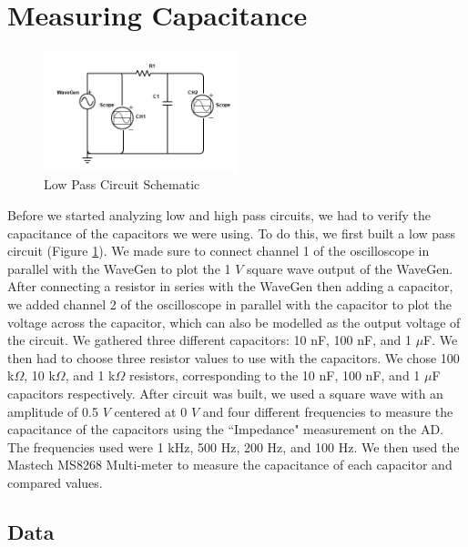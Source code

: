 \documentclass{article}
\begin{document}
\section{Measuring Capacitance}
\vspace{-1mm}
\begin{figure}\vspace{-5mm}
    \centering
    \includegraphics[width=0.5\textwidth]{Images/Scheme-it-export-PHYS-605-L3A2-Low-Pass-2024-03-02-22-46.png}
    \caption{Low Pass Circuit Schematic}
    \label{fig:Low Pass Circuit}
\end{figure}
Before we started analyzing low and high pass circuits, we had to verify the capacitance of the capacitors we were using. To do this, we first built a low pass circuit (Figure \ref{fig:Low Pass Circuit}). We made sure to connect channel 1 of the oscilloscope in parallel with the WaveGen to plot the 1 $V$ square wave output of the WaveGen. After connecting a resistor in series with the WaveGen then adding a capacitor, we added channel 2 of the oscilloscope in parallel with the capacitor to plot the voltage across the capacitor, which can also be modelled as the output voltage of the circuit. We gathered three different capacitors: 10 nF, 100 nF, and 1 $\mu$F. We then had to choose three resistor values to use with the capacitors. We chose 100 k$\Omega$, 10 k$\Omega$, and 1 k$\Omega$ resistors, corresponding to the 10 nF, 100 nF, and 1 $\mu$F capacitors respectively. After circuit was built, we used a square wave with an amplitude of 0.5 $V$ centered at 0 $V$ and four different frequencies to measure the capacitance of the capacitors using the ``Impedance" measurement on the AD. The frequencies used were 1 kHz, 500 Hz, 200 Hz, and 100 Hz. We then used the Mastech MS8268 Multi-meter to measure the capacitance of each capacitor and compared values.

\subsection{Data}
\end{document}
